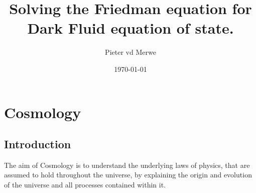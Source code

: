 \documentclass[a4paper, 11pt]{FSKH_623_Report}
\title{Solving the Friedman equation for Dark Fluid equation of state.}
\author{Pieter vd Merwe}
\date{\today}
\numberwithin{equation}{section}
\begin{document}
\maketitle

\tableofcontents                                                  
\pagebreak
{}
\chapter{Cosmology}
\section{Introduction}
The aim of Cosmology is to understand the underlying laws of physics, that are assumed to hold throughout the universe, by explaining the origin and evolution of the universe and all processes contained within it. 
\end{document}
